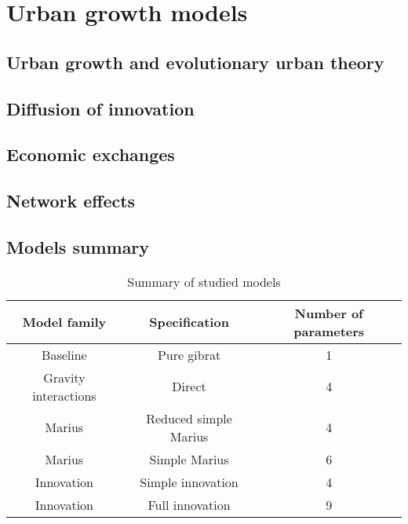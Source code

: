 \documentclass[alpha-refs]{wiley-article}
\begin{document}
\section{Urban growth models}


\subsection{Urban growth and evolutionary urban theory}


\subsection{Diffusion of innovation}


\subsection{Economic exchanges}



\subsection{Network effects}





\subsection{Models summary}



\begin{table}
	\caption{Summary of studied models}
	\begin{tabular}{|c|c|c}
		Model family & Specification & Number of parameters \\\hline
		Baseline & Pure gibrat & 1 \\
		Gravity interactions & Direct & 4 \\
		Marius & Reduced simple Marius & 4 \\
		Marius & Simple Marius & 6 \\
		Innovation & Simple innovation & 4 \\
		Innovation & Full innovation & 9 \\
	\end{tabular}
	
\end{table}
\end{document}
